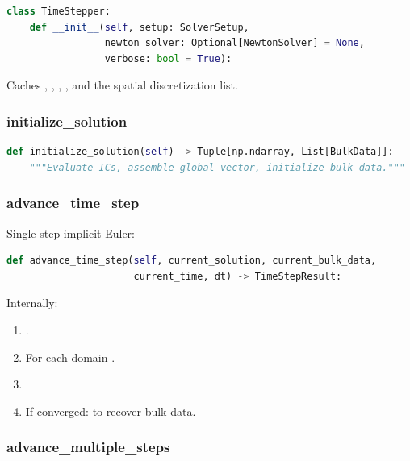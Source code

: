 \begin{lstlisting}[language=Python, caption={TimeStepper constructor}]
class TimeStepper:
    def __init__(self, setup: SolverSetup,
                 newton_solver: Optional[NewtonSolver] = None,
                 verbose: bool = True):
\end{lstlisting}

\noindent Caches , ,
, , and the spatial
discretization list.

\subsubsection{initialize\_solution}

\begin{lstlisting}[language=Python, caption={Initial condition setup}]
def initialize_solution(self) -> Tuple[np.ndarray, List[BulkData]]:
    """Evaluate ICs, assemble global vector, initialize bulk data."""
\end{lstlisting}

\subsubsection{advance\_time\_step}

Single-step implicit Euler:

\begin{lstlisting}[language=Python, caption={One time step}]
def advance_time_step(self, current_solution, current_bulk_data,
                      current_time, dt) -> TimeStepResult:
\end{lstlisting}

\noindent Internally:
\begin{enumerate}
  \item {}.
  \item For each domain .
  \item {} 
  \item If converged:  to recover bulk data.
\end{enumerate}

\subsubsection{advance\_multiple\_steps}

